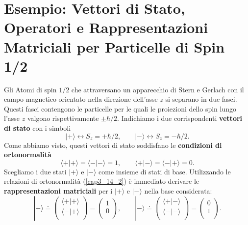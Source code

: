 \section[Esempio:Particelle di Spin 1/2]{Esempio: Vettori di Stato, Operatori e Rappresentazioni Matriciali per Particelle di Spin 1/2}
Gli Atomi di spin $1/2$ che attraversano un apparecchio di Stern e Gerlach con il campo magnetico orientato nella direzione dell'asse $z$ si separano in due fasci. Questi fasci contengono le particelle per le quali le proiezioni dello spin lungo l'asse $z$ valgono rispettivamente $\pm \hbar/2$. Indichiamo i due corrispondenti \textbf{vettori di stato} con i simboli
	\begin{equation}
		\boxed{
		| + \rangle \leftrightarrow S_z= +\hbar/2, \qquad | - \rangle \leftrightarrow S_z=-\hbar/2 .
		}
	\label{cap3_14}
	\end{equation}
Come abbiamo visto, questi vettori di stato soddisfano le \textbf{condizioni di ortonormalità}
	\begin{equation}
		\boxed{
			\langle + | + \rangle = \langle - | - \rangle =1,\qquad \langle + | - \rangle = \langle - | + \rangle =0 .
			}
	\label{cap3_14_2}
	\end{equation}
Scegliamo i due stati $| + \rangle $ e $ | - \rangle$ come insieme di stati di base. Utilizzando le relazioni di ortonormalità (\ref{cap3_14_2}) è immediato derivare le \textbf{rappresentazioni matriciali} per i $| + \rangle$ e $| - \rangle$ nella base considerata:
	\begin{equation}
		| + \rangle \doteq
		\begin{pmatrix}
		\langle + | + \rangle \\
		\langle - | + \rangle \\
		\end{pmatrix} = 
		\begin{pmatrix}
		1 \\
		0 \\
		\end{pmatrix}, \qquad
		| - \rangle \doteq
		\begin{pmatrix}
		\langle + | - \rangle \\
		\langle - | - \rangle \\
		\end{pmatrix} = 
		\begin{pmatrix}
		0 \\
		1 \\
		\end{pmatrix} .
	\end{equation}
